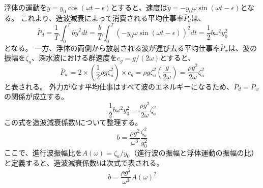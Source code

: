 \documentclass[11pt, dvipdfmx]{jsarticle}
\begin{document}
浮体の運動を$y=y_0\cos(\omega t - \epsilon)$とすると、速度は$\dot{y} = -y_0\omega\sin(\omega t - \epsilon)$となる。
これより、造波減衰によって消費される平均仕事率$\bar{P}_d$は、
$$
\bar{P}_d = \frac{1}{T}\int_0^T b\dot{y}^2dt = \frac{b}{T}\int_0^T (-y_0\omega\sin(\omega t - \epsilon))^2 dt = \frac{1}{2}b\omega^2 y_0^2
$$
となる。
一方、浮体の両側から放射される波が運び去る平均仕事率$\bar{P}_w$は、波の振幅を$\zeta_a$、深水波における群速度を$c_g=g/(2\omega)$とすると、
$$
\bar{P}_w = 2 \times \left(\frac{1}{2}\rho g \zeta_a^2\right) \times c_g = \rho g \zeta_a^2 \left(\frac{g}{2\omega}\right) = \frac{\rho g^2}{2\omega}\zeta_a^2
$$
と表される。
外力がなす平均仕事はすべて波のエネルギーになるため、$\bar{P}_d = \bar{P}_w$の関係が成立する。
$$
\frac{1}{2}b\omega^2 y_0^2 = \frac{\rho g^2}{2\omega}\zeta_a^2
$$
この式を造波減衰係数$b$について整理する。
$$
b = \frac{\rho g^2}{\omega^3}\frac{\zeta_a^2}{y_0^2}
$$
ここで、進行波振幅比を$A(\omega) = \zeta_a / y_0$（進行波の振幅と浮体運動の振幅の比）と定義すると、造波減衰係数$b$は次式で表される。
$$
b = \frac{\rho g^2}{\omega^3}A(\omega)^2
$$
\end{document}
